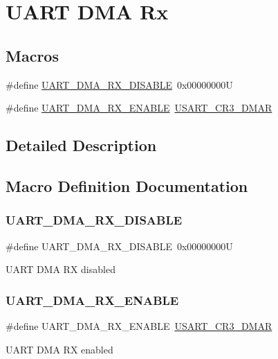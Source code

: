 \hypertarget{group___u_a_r_t___d_m_a___rx}{}\section{U\+A\+RT D\+MA Rx}
\label{group___u_a_r_t___d_m_a___rx}
\subsection*{Macros}
\begin{DoxyCompactItemize}
\item 
\#define \mbox{\hyperlink{group___u_a_r_t___d_m_a___rx_gac65987cb4d8fd5da0f7dc695312f6afa}{U\+A\+R\+T\+\_\+\+D\+M\+A\+\_\+\+R\+X\+\_\+\+D\+I\+S\+A\+B\+LE}}~0x00000000U
\item 
\#define \mbox{\hyperlink{group___u_a_r_t___d_m_a___rx_gab871994de6d36a02b8ec34af197dff1d}{U\+A\+R\+T\+\_\+\+D\+M\+A\+\_\+\+R\+X\+\_\+\+E\+N\+A\+B\+LE}}~\mbox{\hyperlink{group___peripheral___registers___bits___definition_gaff130f15493c765353ec2fd605667c5a}{U\+S\+A\+R\+T\+\_\+\+C\+R3\+\_\+\+D\+M\+AR}}
\end{DoxyCompactItemize}


\subsection{Detailed Description}


\subsection{Macro Definition Documentation}
\mbox{\label{group___u_a_r_t___d_m_a___rx_gac65987cb4d8fd5da0f7dc695312f6afa}} 
\subsubsection{\texorpdfstring{UART\_DMA\_RX\_DISABLE}{UART\_DMA\_RX\_DISABLE}}
{\footnotesize\ttfamily \#define U\+A\+R\+T\+\_\+\+D\+M\+A\+\_\+\+R\+X\+\_\+\+D\+I\+S\+A\+B\+LE~0x00000000U}

U\+A\+RT D\+MA RX disabled \mbox{\label{group___u_a_r_t___d_m_a___rx_gab871994de6d36a02b8ec34af197dff1d}} 
\subsubsection{\texorpdfstring{UART\_DMA\_RX\_ENABLE}{UART\_DMA\_RX\_ENABLE}}
{\footnotesize\ttfamily \#define U\+A\+R\+T\+\_\+\+D\+M\+A\+\_\+\+R\+X\+\_\+\+E\+N\+A\+B\+LE~\mbox{\hyperlink{group___peripheral___registers___bits___definition_gaff130f15493c765353ec2fd605667c5a}{U\+S\+A\+R\+T\+\_\+\+C\+R3\+\_\+\+D\+M\+AR}}}

U\+A\+RT D\+MA RX enabled 
